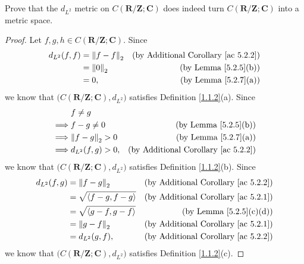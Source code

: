 \begin{exercise}\label{ex 5.2.4}
    Prove that the \(d_{L^2}\) metric on \(C(\mathbf{R} / \mathbf{Z} ; \mathbf{C})\) does indeed turn \(C(\mathbf{R} / \mathbf{Z} ; \mathbf{C})\) into a metric space.
\end{exercise}

\begin{proof}
    Let \(f, g, h \in C(\mathbf{R} / \mathbf{Z} ; \mathbf{C})\).
    Since
    \begin{align*}
        d_{L^2}(f, f) & = \norm*{f - f}_2 & \text{(by Additional Corollary \ref{ac 5.2.2})} \\
                      & = \norm*{0}_2     & \text{(by Lemma \ref{5.2.5}(b))}                \\
                      & = 0,              & \text{(by Lemma \ref{5.2.7}(a))}
    \end{align*}
    we know that \(\big(C(\mathbf{R} / \mathbf{Z} ; \mathbf{C}), d_{L^2}\big)\) satisfies Definition \ref{1.1.2}(a).
    Since
    \begin{align*}
                 & f \neq g                                                              \\
        \implies & f - g \neq 0        & \text{(by Lemma \ref{5.2.5}(b))}                \\
        \implies & \norm*{f - g}_2 > 0 & \text{(by Lemma \ref{5.2.7}(a))}                \\
        \implies & d_{L^2}(f, g) > 0,  & \text{(by Additional Corollary \ref{ac 5.2.2})}
    \end{align*}
    we know that \(\big(C(\mathbf{R} / \mathbf{Z} ; \mathbf{C}), d_{L^2}\big)\) satisfies Definition \ref{1.1.2}(b).
    Since
    \begin{align*}
        d_{L^2}(f, g) & = \norm*{f - g}_2              & \text{(by Additional Corollary \ref{ac 5.2.2})} \\
                      & = \sqrt{\inner*{f - g, f - g}} & \text{(by Additional Corollary \ref{ac 5.2.1})} \\
                      & = \sqrt{\inner*{g - f, g - f}} & \text{(by Lemma \ref{5.2.5}(c)(d))}             \\
                      & = \norm*{g - f}_2              & \text{(by Additional Corollary \ref{ac 5.2.1})} \\
                      & = d_{L^2}(g, f),               & \text{(by Additional Corollary \ref{ac 5.2.2})}
    \end{align*}
    we know that \(\big(C(\mathbf{R} / \mathbf{Z} ; \mathbf{C}), d_{L^2}\big)\) satisfies Definition \ref{1.1.2}(c).

\end{proof}
